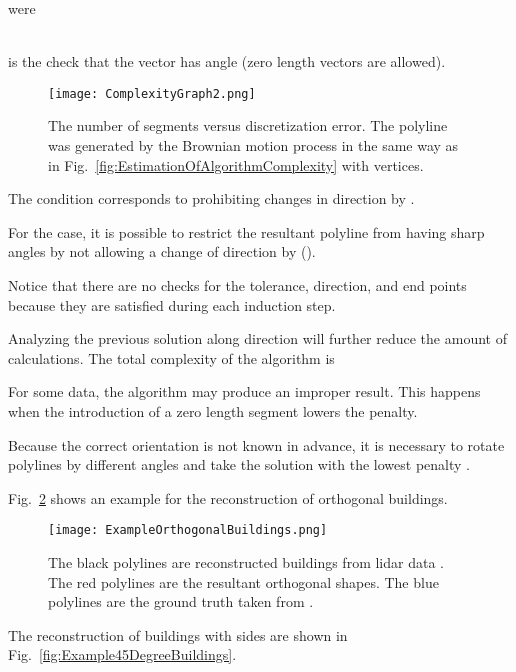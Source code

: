 \documentclass[conference]{IEEEtran}
\begin{document}
were

\\
 is the check that the vector  has angle  (zero length vectors are allowed).

\begin{figure} [t]
  \centering
    \texttt{[image: ComplexityGraph2.png]}
  \caption
  {
    The number of segments versus discretization error. The polyline was generated by the Brownian motion process in the same way as in Fig.~\ref{fig:EstimationOfAlgorithmComplexity} with  vertices.
  }
  \label{fig:GraphCompressionEfficiency}
\end{figure}

The condition  corresponds to prohibiting changes in direction by .

For the  case, it is possible to restrict the resultant polyline from having sharp angles by not allowing a change of direction by  ().

Notice that there are no checks for the tolerance, direction, and end points because they are satisfied during each induction step.

Analyzing the previous solution along  direction will further reduce the amount of calculations. The total complexity of the algorithm is


For some data, the algorithm may produce an improper result. This happens when the introduction of a zero length segment lowers the penalty.

Because the correct orientation is not known in advance, it is necessary to rotate polylines by different angles and take the solution with the lowest penalty \cite[see section 6]{ReconstructionOfOrthogonalPolygonalLines}.

Fig.~\ref{fig:ExampleOrthogonalBuildings} shows an example for the reconstruction of orthogonal buildings.

\begin{figure} [htb]
  \centering
    \texttt{[image: ExampleOrthogonalBuildings.png]}
  \caption
  {
    The black polylines are reconstructed buildings from lidar data \cite{ReferenceLIDARData}. The red polylines are the resultant orthogonal shapes. The blue polylines are the ground truth taken from \cite{ReferenceGroundTruthData}.
  }
  \label{fig:ExampleOrthogonalBuildings}
\end{figure}

The reconstruction of buildings with  sides are shown in Fig.~\ref{fig:Example45DegreeBuildings}.
\end{document}

